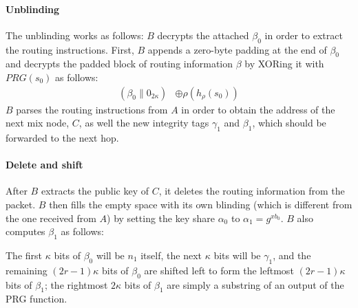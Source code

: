 \paragraph{Unblinding}
The unblinding works as follows: $B$ decrypts the attached $\beta_0$ in order to extract the routing instructions. First, $B$ appends a zero-byte padding at the end of $\beta_0$ and decrypts the padded block of routing information $\beta$ by XORing it with $PRG(s_{0})$ as follows:
\begin{align}
    (\beta_0\|0_{2\kappa})&\oplus \rho(h_{\rho}(s_{0}))
\end{align}
$B$ parses the routing instructions from $A$ in order to obtain the address of the next mix node, $C$, as well the new integrity tags $\gamma_1$ and $\beta_1$, which should be forwarded to the next hop.
\paragraph{Delete and shift}
After $B$ extracts the public key of $C$, it deletes the routing information from the packet. $B$ then fills the empty space with its own blinding (which is different from the one received from $A$) by setting the key share $\alpha_0$ to $\alpha_1=g^{xb_0}$. $B$ also computes $\beta_1$ as follows:

The first $\kappa$ bits of $\beta_0$ will be $n_{1}$ itself, the next $\kappa$ bits will be $\gamma_{1}$, and the remaining $(2r-1)\kappa$ bits of $\beta_0$ are shifted left to form the leftmost $(2r-1)\kappa$ bits of $\beta_{1}$; the rightmost $2\kappa$ bits of $\beta_{1}$ are simply a substring of an output of the PRG function.

